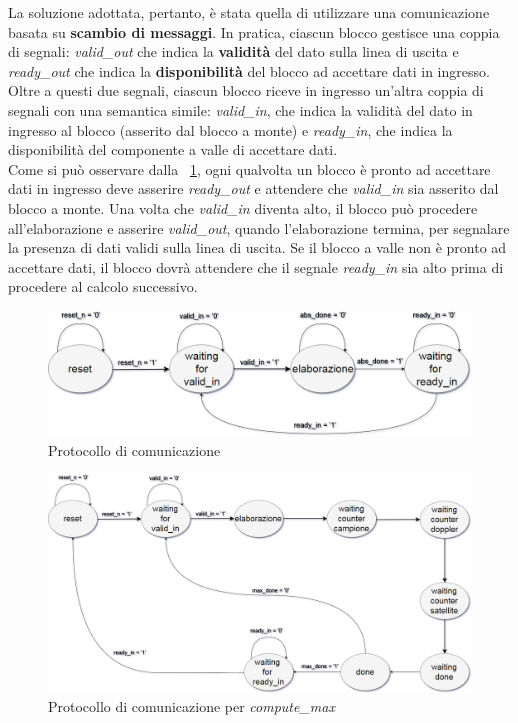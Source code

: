 \documentclass[12pt,a4paper,twoside,openany]{book}
\begin{document}
La soluzione adottata, pertanto, è stata quella di utilizzare una comunicazione basata su \textbf{scambio di messaggi}. In pratica, ciascun blocco gestisce una coppia di segnali: \textit{valid\_out} che indica la \textbf{validità} del dato sulla linea di uscita e \textit{ready\_out} che indica la \textbf{disponibilità} del blocco ad accettare dati in ingresso. Oltre a questi due segnali, ciascun blocco riceve in ingresso un'altra coppia di segnali con una semantica simile: \textit{valid\_in}, che indica la validità del dato in ingresso al blocco (asserito dal blocco a monte) e \textit{ready\_in}, che indica la disponibilità del componente a valle di accettare dati. \\
Come si può osservare dalla \figurename~\ref{wrapperabs_fsm}, ogni qualvolta un blocco è pronto ad accettare dati in ingresso deve asserire \textit{ready\_out} e attendere che \textit{valid\_in} sia asserito dal blocco a monte. Una volta che \textit{valid\_in} diventa alto, il blocco può procedere all'elaborazione e asserire \textit{valid\_out}, quando l'elaborazione termina, per segnalare la presenza di dati validi sulla linea di uscita. Se il blocco a valle non è pronto ad accettare dati, il blocco dovrà attendere che il segnale \textit{ready\_in} sia alto prima di procedere al calcolo successivo.

\begin{figure}
\begin{center}
\includegraphics[scale=0.33, keepaspectratio]{immagini/fsm_wrapper_abs}
\caption{Protocollo di comunicazione}
\label{wrapperabs_fsm}
\end{center}
\end{figure}

\clearpage
\begin{figure}
\begin{center}
\includegraphics[scale=0.28, keepaspectratio]{immagini/fsm_wrapper_max}
\caption{Protocollo di comunicazione per \textit{compute\_max}}
\label{wrappermax_fsm}
\end{center}
\end{figure}
\end{document}
